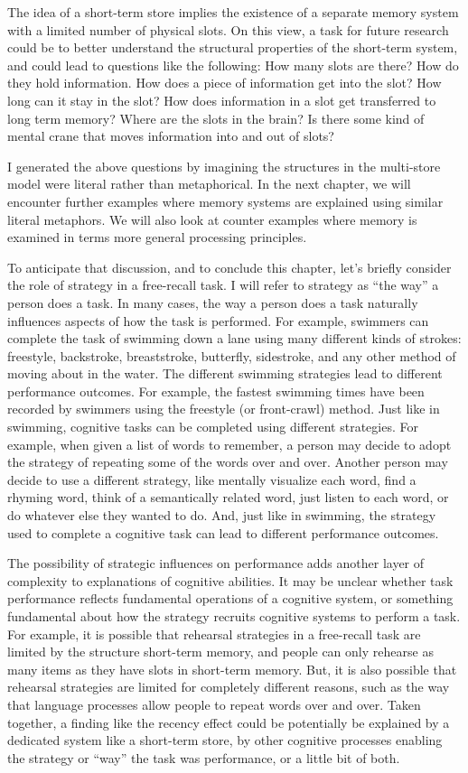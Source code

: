 \documentclass[
  oneside,
  12pt]{crumpbook}
\begin{document}
The idea of a short-term store implies the existence of a separate memory system with a limited number of physical slots. On this view, a task for future research could be to better understand the structural properties of the short-term system, and could lead to questions like the following: How many slots are there? How do they hold information. How does a piece of information get into the slot? How long can it stay in the slot? How does information in a slot get transferred to long term memory? Where are the slots in the brain? Is there some kind of mental crane that moves information into and out of slots?

I generated the above questions by imagining the structures in the multi-store model were literal rather than metaphorical. In the next chapter, we will encounter further examples where memory systems are explained using similar literal metaphors. We will also look at counter examples where memory is examined in terms more general processing principles.

To anticipate that discussion, and to conclude this chapter, let's briefly consider the role of strategy in a free-recall task. I will refer to strategy as ``the way'' a person does a task. In many cases, the way a person does a task naturally influences aspects of how the task is performed. For example, swimmers can complete the task of swimming down a lane using many different kinds of strokes: freestyle, backstroke, breaststroke, butterfly, sidestroke, and any other method of moving about in the water. The different swimming strategies lead to different performance outcomes. For example, the fastest swimming times have been recorded by swimmers using the freestyle (or front-crawl) method. Just like in swimming, cognitive tasks can be completed using different strategies. For example, when given a list of words to remember, a person may decide to adopt the strategy of repeating some of the words over and over. Another person may decide to use a different strategy, like mentally visualize each word, find a rhyming word, think of a semantically related word, just listen to each word, or do whatever else they wanted to do. And, just like in swimming, the strategy used to complete a cognitive task can lead to different performance outcomes.

The possibility of strategic influences on performance adds another layer of complexity to explanations of cognitive abilities. It may be unclear whether task performance reflects fundamental operations of a cognitive system, or something fundamental about how the strategy recruits cognitive systems to perform a task. For example, it is possible that rehearsal strategies in a free-recall task are limited by the structure short-term memory, and people can only rehearse as many items as they have slots in short-term memory. But, it is also possible that rehearsal strategies are limited for completely different reasons, such as the way that language processes allow people to repeat words over and over. Taken together, a finding like the recency effect could be potentially be explained by a dedicated system like a short-term store, by other cognitive processes enabling the strategy or ``way'' the task was performance, or a little bit of both.
\end{document}
